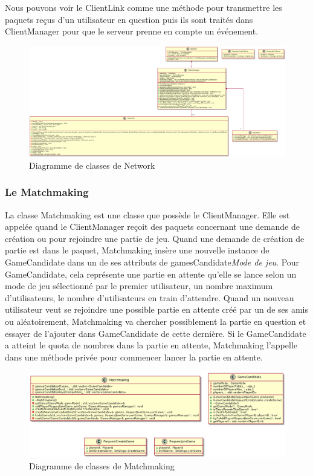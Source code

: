 \documentclass{article}
\begin{document}
Nous pouvons voir le ClientLink comme une méthode pour transmettre les paquets reçus d'un utilisateur en question puis ils sont traités dans ClientManager pour que le serveur prenne en compte un événement.

\begin{figure}[H]
	\centering
	 \includegraphics[scale=0.2]{../res/uml/class/NetworkClass.png}
	 \caption{Diagramme de classes de Network}
	 \label{fig:NetworkDiagram}
\end{figure}

\subsubsection{Le Matchmaking}

La classe Matchmaking est une classe que possède le ClientManager. Elle est appelée quand le ClientManager reçoit des paquets concernant une demande de  création ou pour rejoindre une partie de jeu. Quand une demande de création de partie est dans le paquet, Matchmaking insère une nouvelle instance de GameCandidate dans un de ses attributs de gamesCandidate\textit{Mode de jeu}. Pour GameCandidate, cela représente une partie en attente qu'elle se lance selon un mode de jeu sélectionné par le premier utilisateur, un nombre maximum d'utilisateurs, le nombre d'utilisateurs en train d'attendre. Quand un nouveau utilisateur veut se rejoindre une possible partie en attente créé par un de ses amis ou aléatoirement, Matchmaking va chercher possiblement la partie en question et essayer de l'ajouter dans GameCandidate de cette dernière. Si le GameCandidate a atteint le quota de nombres dans la partie en attente, Matchmaking l'appelle dans une méthode privée pour commencer lancer la partie en attente. 

\begin{figure}[H]
	\centering
	 \includegraphics[scale=0.2]{../res/uml/class/MatchMakingClass.png}
	 \caption{Diagramme de classes de Matchmaking}
	 \label{fig:MatchmakingDiagram}
\end{figure}
\end{document}
